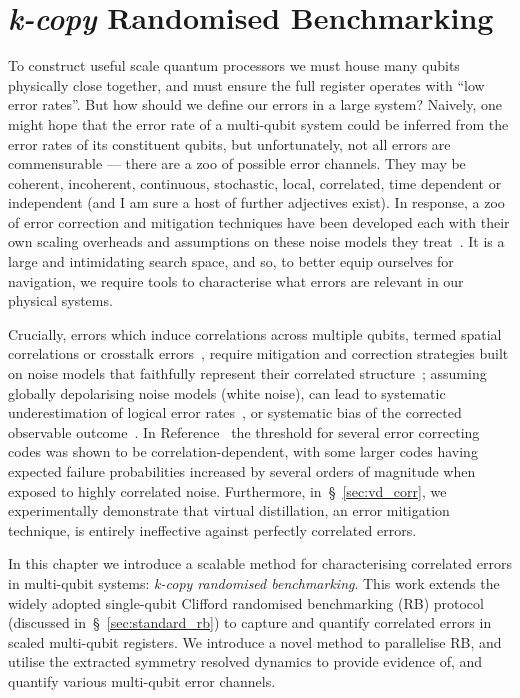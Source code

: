 \chapter{\emph{k-copy} Randomised Benchmarking}
\label{ch:k-copy}
\minitoc
To construct useful scale quantum processors we must house many qubits physically close together, and must ensure the full register operates with ``low error rates''. But how should we define our errors in a large system? Naively, one might hope that the error rate of a multi-qubit system could be inferred from the error rates of its constituent qubits, but unfortunately, not all errors are commensurable --- there are a zoo of possible error channels. They may be coherent, incoherent, continuous, stochastic, local, correlated, time dependent or independent (and I am sure a host of further adjectives exist).  In response, a zoo of error correction and mitigation techniques have been developed each with their own scaling overheads and assumptions on these noise models they treat~\cite{shor_fault-tolerant_1996,aharonov_fault-tolerant_2008,cai_quantum_2023}.
It is a large and intimidating search space, and so, to better equip ourselves for navigation, we require tools to characterise what errors are relevant in our physical systems. 

Crucially, errors
which induce correlations across multiple qubits, termed spatial correlations or crosstalk errors~\cite{zou_spatially_2024, sarovar_detecting_2020}, require mitigation and correction strategies built on noise
models that faithfully represent their correlated structure~\cite{layden_efficient_2020}; assuming
globally depolarising noise models (white noise), can lead to systematic underestimation of logical error rates~\cite{aharonov_fault-tolerant_2006, preskill_sufficient_2013}, or systematic bias of the corrected observable outcome~\cite{foldager_can_2024}.
In Reference~\cite{clemens_quantum_2004} the threshold for several error correcting codes was shown to be correlation-dependent, with some larger codes having expected failure probabilities increased by several orders of magnitude when exposed to highly correlated noise. Furthermore, in~\S~\ref{sec:vd_corr}, we experimentally demonstrate that virtual distillation, an error mitigation technique, is entirely ineffective against perfectly correlated errors.

In this chapter we introduce a scalable method for characterising correlated errors in multi-qubit systems: \emph{k-copy randomised benchmarking}. 
This work extends the widely adopted single-qubit
Clifford randomised benchmarking (RB) protocol~\cite{magesan_scalable_2011,knill_randomized_2008,dankert_exact_2009} (discussed in~\S~\ref{sec:standard_rb}) to capture and quantify correlated errors in scaled multi-qubit registers.
We introduce a novel method to parallelise RB, and utilise the extracted symmetry resolved dynamics to provide evidence of, and quantify various multi-qubit error channels. 

